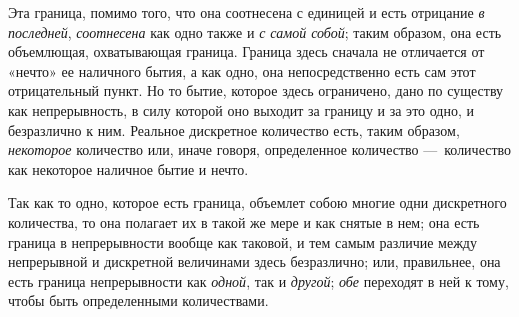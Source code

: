Эта граница, помимо того, что она соотнесена с единицей и есть отрицание
{\em в последней}, {\em соотнесена}
как одно также и {\em с самой собой}; таким образом,
она есть объемлющая, охватывающая граница. Граница здесь сначала не
отличается от «нечто» ее наличного бытия, а как одно, она непосредственно
есть сам этот отрицательный пункт. Но то бытие, которое здесь ограничено,
дано по существу как непрерывность, в силу которой оно выходит за границу и
за это одно, и безразлично к ним. Реальное дискретное количество есть,
таким образом, {\em некоторое} количество или, иначе
говоря, определенное количество —~количество как некоторое наличное бытие и
нечто.

Так как то одно, которое есть граница, объемлет собою многие одни
дискретного количества, то она полагает их в такой же мере и как снятые в
нем; она есть граница в непрерывности вообще как таковой, и тем самым
различие между непрерывной и дискретной величинами здесь безразлично; или,
правильнее, она есть граница непрерывности как
{\em одной}, так и {\em другой};
{\em обе} переходят в ней к тому, чтобы быть
определенными количествами.

\bigskip
